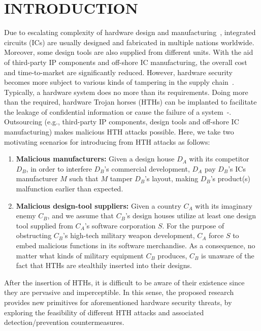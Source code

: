 \section{INTRODUCTION}
Due to escalating complexity of hardware design and manufacturing~\cite{semiconductor2015international}, integrated circuits (ICs) are usually designed and fabricated in multiple nations worldwide. Moreover, some design tools are also supplied from different units. With the aid of third-party IP components and off-shore IC manufacturing, the overall cost and time-to-market are significantly reduced. However, hardware security becomes more subject to various kinds of tampering in the supply chain~\cite{tehranipoor2011trustworthy}\cite{karri2010trustworthy}. Typically, a hardware system does no more than its requirements. Doing more than the required, hardware Trojan horses (HTHs) can be implanted to facilitate the leakage of confidential information or cause the failure of a system~\cite{adee2008hunt}-\cite{bhunia2014hardware}. Outsourcing (e.g., third-party IP components, design tools and off-shore IC manufacturing) makes malicious HTH attacks possible. Here, we take two motivating scenarios for introducing from HTH attacks as follows:
\begin{enumerate}[wide, labelwidth=!, labelindent=0pt]%
	\item \textbf{Malicious manufacturers:} Given a design house $D_{A}$ with its competitor $D_{B}$, in order to interfere $D_{B}$'s commercial development, $D_{A}$ pay $D_{B}$'s ICs manufacturer $M$ such that $M$ tamper $D_{B}$'s layout, making $D_{B}$'s product(s) malfunction earlier than expected.
	\item \textbf{Malicious design-tool suppliers:} Given a country $C_{A}$ with its imaginary enemy $C_{B}$, and we assume that $C_{B}$'s design houses utilize at least one design tool supplied from $C_{A}$'s software corporation $S$. For the purpose of obstructing $C_{B}$'s high-tech military weapon development, $C_{A}$ force $S$ to embed malicious functions in its software merchandise. As a consequence, no matter what kinds of military equipment $C_{B}$ produces, $C_{B}$ is unaware of the fact that HTHs are stealthily inserted into their designs.
\end{enumerate}

After the insertion of HTHs, it is difficult to be aware of their existence since they are pervasive and imperceptible. In this sense, the proposed research provides new primitives for aforementioned hardware security threats, by exploring the feasibility of different HTH attacks and associated detection/prevention countermeasures.

